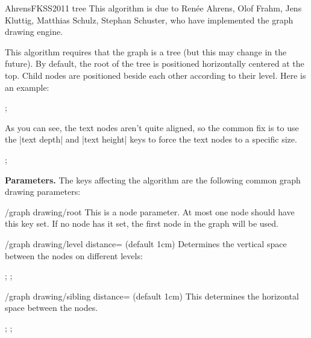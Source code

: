 \begin{gdalgorithm}{AhrensFKSS2011 tree}
  This algorithm is due to Ren\'ee Ahrens, Olof Frahm, Jens Kluttig,
  Matthias Schulz, Stephan Schuster, who have implemented the graph
  drawing engine.
  
  This algorithm requires that the graph is a tree (but this may
  change in the future). By default, the root of the tree is
  positioned horizontally centered at the top. Child nodes are
  positioned beside each other according to their level. Here is an
  example: 

\begin{codeexample}[]
 ;
\end{codeexample}

  As you can see, the text nodes aren't quite aligned, so the common fix
  is to use the |text depth| and |text height| keys to force the text
  nodes to a specific size.

\begin{codeexample}[]
\tikz[AhrensFKSS2011 tree, text depth=.2em, text height=.8em]
  ;
\end{codeexample}

  \medskip
  \noindent\textbf{Parameters.} 
  The keys affecting the algorithm are the following common graph
  drawing parameters:

  \begin{key}{/graph drawing/root}
    This is a node parameter. At most one node should have this key
    set. If no node has it set, the first node in the graph will be
    used. 
  \end{key}

  \begin{key}{/graph drawing/level distance= (default 1cm)}
    Determines the vertical space between the nodes on different levels:
\begin{codeexample}[]
\tikz [AhrensFKSS2011 tree, level distance=1cm]
  ;
\tikz [AhrensFKSS2011 tree, level distance=2cm]
  ;
\end{codeexample}
  \end{key}

  \begin{key}{/graph drawing/sibling distance= (default 1cm)}
    This determines the horizontal space between the nodes. 
\begin{codeexample}[]
\tikz [AhrensFKSS2011 tree, sibling distance=1cm]
  ;
\tikz [AhrensFKSS2011 tree, sibling distance=2cm]
  ;
\end{codeexample}
\end{key}


\end{gdalgorithm}
